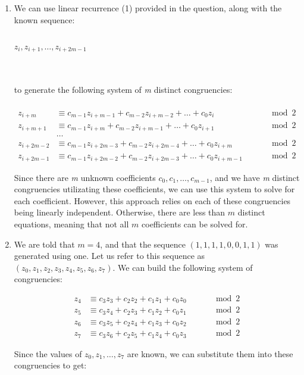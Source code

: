 \documentclass[11pt]{article}
\theoremstyle{definition}
\begin{document}
\begin{enumerate}
\begin{enumerate}
\item We can use linear recurrence (1) provided in the question, along with the known sequence: \\ \\
\centerline{$z_{i}, z_{i+1}, \ldots , z_{i+2m-1}$}
\\ \\
to generate the following system of \textit{m} distinct congruencies:\\ \\
\begin{align*}
z_{i+m} &\equiv c_{m-1} z_{i+m-1} + c_{m-2} z_{i+m-2} + \ldots + c_0 z_i \qquad &\mod{2}\\
z_{i+m+1} &\equiv c_{m-1} z_{i+m} + c_{m-2} z_{i+m-1} + \ldots + c_0 z_{i+1} \qquad &\mod{2}\\
&\ldots \\
z_{i+2m-2} &\equiv c_{m-1} z_{i+2m-3} + c_{m-2} z_{i+2m-4} + \ldots + c_0 z_{i+m} \qquad &\mod{2}\\
z_{i+2m-1} &\equiv c_{m-1} z_{i+2m-2} + c_{m-2} z_{i+2m-3} + \ldots + c_0 z_{i+m-1} \qquad &\mod{2}
\end{align*}

Since there are \textit{m} unknown coefficients $c_0, c_1, \ldots , c_{m-1}$, and we have \textit{m} distinct congruencies utilizating these coefficients, we can use this system to solve for each coefficient. 
However, this approach relies on each of these congruencies being linearly independent. Otherwise, there are less than $m$ distinct equations, meaning that not all $m$ coefficients can be solved for.

\item We are told that $m = 4$, and that the sequence $(1, 1, 1, 1, 0, 0, 1, 1)$ was generated using one. Let us refer to this sequence as $(z_0, z_1, z_2, z_3, z_4, z_5, z_6, z_7)$. We can build the following system of congruencies:

\begin{align*}
z_4 &\equiv c_3  z_3 + c_2  z_2 + c_1  z_1 + c_0  z_0 \qquad &\mod{2}\\
z_5 &\equiv c_3  z_4 + c_2  z_3 + c_1  z_2 + c_0  z_1 \qquad &\mod{2}\\
z_6 &\equiv c_3  z_5 + c_2  z_4 + c_1  z_3 + c_0  z_2 \qquad &\mod{2}\\
z_7 &\equiv c_3  z_6 + c_2  z_5 + c_1  z_4 + c_0  z_3 \qquad &\mod{2}
\end{align*}

Since the values of $z_0, z_1, \ldots , z_7$ are known, we can substitute them into these congruencies to get:


\end{enumerate}
\end{enumerate}
\end{document}
